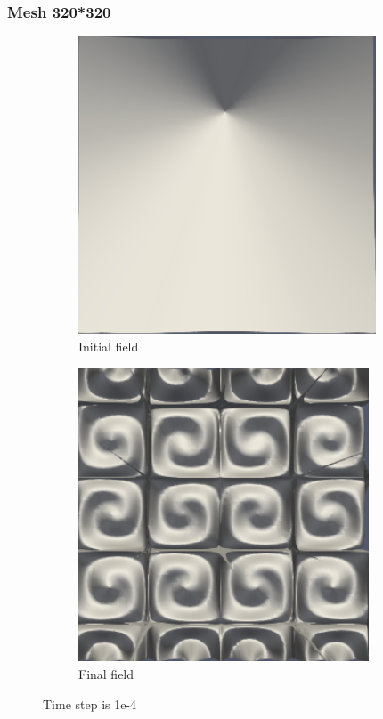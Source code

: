 \documentclass{article}
\begin{document}
\subsubsection{Mesh 320*320}
\begin{figure}[hbt!]
  \begin{subfigure}{0.4\textwidth}
        \centering
        \includegraphics[width=\textwidth]{Figures/e-4 320x320/for n1 .png}
        \caption{Initial field}
  \end{subfigure}
  \hfill
  \begin{subfigure}{0.4\textwidth}
        \centering
        \includegraphics[width=\textwidth]{Figures/e-4 320x320/for n 10.png}
        \caption{Final field}
  \end{subfigure}
  \caption{Time step is 1e-4}
  \label{t1m5_1} 
\end{figure}
\end{document}
